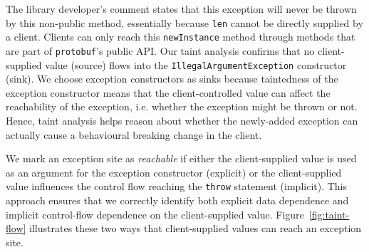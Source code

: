 The library developer's comment states that this exception will never be thrown by this non-public method, essentially because \texttt{len} cannot be directly supplied by a client. Clients can only reach this \texttt{newInstance} method through methods that are part of \texttt{protobuf}'s public API. Our taint analysis confirms that no client-supplied value (source) flows into the \texttt{IllegalArgumentException} constructor (sink). We choose exception constructors as sinks because taintedness of the exception constructor means that the client-controlled value can affect the reachability of the exception, i.e. whether the exception might be thrown or not. Hence, taint analysis helps reason about whether the newly-added exception can actually cause a behavioural breaking change in the client.

We mark an exception site as \emph{reachable} if either the client-supplied value is used as an argument for the exception constructor (explicit) or the client-supplied value influences the control flow reaching the \texttt{throw} statement (implicit). This approach ensures that we correctly identify both explicit data dependence and implicit control-flow dependence on the client-supplied value.
Figure~\ref{fig:taint-flow} illustrates these two ways that client-supplied values can reach an exception site.

